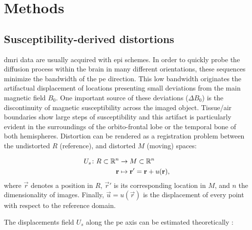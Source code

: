 \section{Methods}
\label{sec:methods}
%

\subsection{Susceptibility-derived distortions}
\label{sec:distortions}
\Gls*{dmri} data are usually acquired with \gls*{epi} schemes.
In order to quickly probe the diffusion process within the brain in many different orientations,
  these sequences minimize the bandwidth of the \gls*{pe} direction.
This low bandwidth originates the artifactual displacement of locations presenting small deviations
  from the main magnetic field $B_0$.
One important source of these deviations ($\Delta B_0$) is the discontinuity of magnetic
  susceptibility across the imaged object.
Tissue/air boundaries show large steps of susceptibility and this artifact is
  particularly evident in the surroundings of the orbito-frontal lobe or the temporal
  bone of both hemispheres.
Distortion can be rendered as a registration problem between the undistorted $R$ (reference), 
  and distorted $M$ (moving) spaces:

  \begin{align}
  U_s\colon R \subset \mathbb{R}^n &\to M \subset \mathbb{R}^n \notag\\
  \vec{r} &\mapsto \vec{r}' =\vec{r}+u(\vec{r}),
  \label{eq:transform}
  \end{align}
%
  where $\vec{r}$ denotes a position in $R$, $\vec{r}'$ is
  its corresponding location in $M$, and $n$ the dimensionality of images.
Finally, $\vec{u} = u(\vec{r})$ is the displacement of every point with respect
  to the reference domain.

The displacements field $U_s$ along the \gls*{pe} axis can be estimated theoretically
  \citep{jezzard_correction_1995}:

